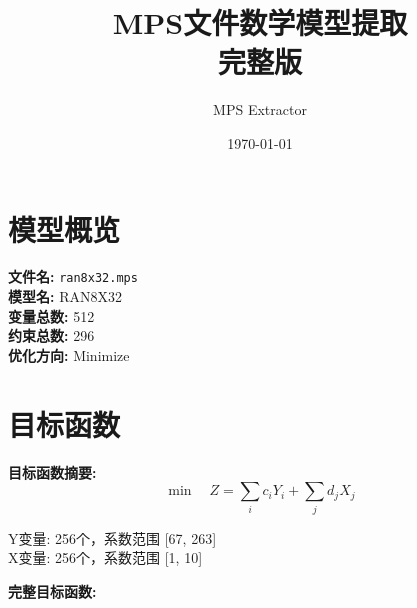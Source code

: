 \documentclass[a4paper,10pt]{article}
\title{MPS文件数学模型提取\\{\large 完整版}}
\author{MPS Extractor}
\date{\today}
\begin{document}
\maketitle
\tableofcontents
\newpage

\section{模型概览}

\textbf{文件名:} \texttt{ran8x32.mps} \\
\textbf{模型名:} RAN8X32 \\
\textbf{变量总数:} 512 \\
\textbf{约束总数:} 296 \\
\textbf{优化方向:} Minimize \\

\section{目标函数}

\textbf{目标函数摘要:}
\begin{equation}
\min \quad Z = \sum_{i} c_i Y_i + \sum_{j} d_j X_j
\end{equation}

Y变量: 256个，系数范围 [67, 263] \\
X变量: 256个，系数范围 [1, 10]

\textbf{完整目标函数:}
\end{document}
